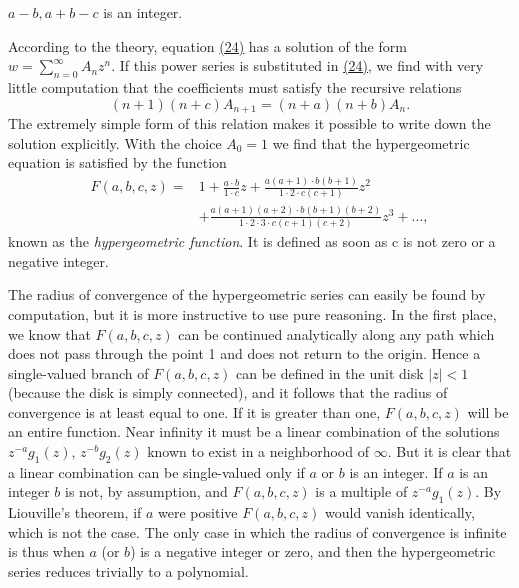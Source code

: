 $a - b, a + b - c$ is an integer.

According to the theory, equation \hyperref[eq:8.24]{(24)} has a solution of the form $w = \sum_{n=0}^{\infty} A_{n} z^{n}$. If this power series is substituted in \hyperref[eq:8.24]{(24)}, we find with very little computation that the coefficients must satisfy the recursive relations
\begin{equation*}
(n + 1) (n + c) A _ {n + 1} = (n + a) (n + b) A _ {n}.
\end{equation*}
The extremely simple form of this relation makes it possible to write down the solution explicitly. With the choice $A_{0} = 1$ we find that the hypergeometric equation is satisfied by the function
\begin{equation*}
\begin{aligned}
F(a,b,c,z)={}&1+\frac{a\cdot b}{1\cdot c}z
+\frac{a(a+1)\cdot b(b+1)}{1\cdot2\cdot c(c+1)}z^2\\
&+\frac{a(a+1)(a+2)\cdot b(b+1)(b+2)}{1\cdot2\cdot3\cdot c(c+1)(c+2)}z^3+\dots,
\end{aligned}
\end{equation*}
known as the \emph{hypergeometric function}. It is defined as soon as c is not zero or a negative integer.

The radius of convergence of the hypergeometric series can easily be found by computation, but it is more instructive to use pure reasoning. In the first place, we know that $F(a,b,c,z)$ can be continued analytically along any path which does not pass through the point 1 and does not return to the origin. Hence a single-valued branch of $F(a,b,c,z)$ can be defined in the unit disk $|z| < 1$ (because the disk is simply connected), and it follows that the radius of convergence is at least equal to one. If it is greater than one, $F(a,b,c,z)$ will be an entire function. Near infinity it must be a linear combination of the solutions $z^{-a}g_1(z)$, $z^{-b}g_2(z)$ known to exist in a neighborhood of $\infty$. But it is clear that a linear combination can be single-valued only if $a$ or $b$ is an integer. If $a$ is an integer $b$ is not, by assumption, and $F(a,b,c,z)$ is a multiple of $z^{-a}g_1(z)$. By Liouville's theorem, if $a$ were positive $F(a,b,c,z)$ would vanish identically, which is not the case. The only case in which the radius of convergence is infinite is thus when $a$ (or $b$) is a negative integer or zero, and then the hypergeometric series reduces trivially to a polynomial.

